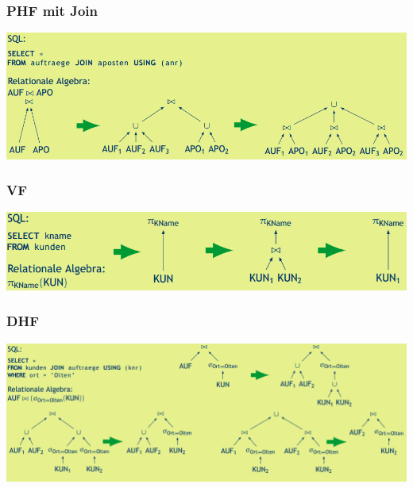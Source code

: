\documentclass[a4paper,11pt]{article}
\begin{document}
\subsubsection{PHF mit Join}
\includegraphics[scale=0.7]{src/phf_join.png}
\subsubsection{VF}
\includegraphics[scale=0.7]{src/vf.png}
\subsubsection{DHF}
\includegraphics[scale=0.65]{src/dhf_red.png}
\end{document}
